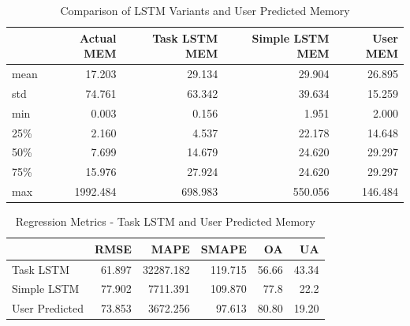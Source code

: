       \begin{table}
        \centering
        \caption{Comparison of LSTM Variants and User Predicted Memory}
        \label{tab:comparison-task-lstm-user-predicted-memory}

        \begin{tabular}{|l|rrrr|}
          \toprule
          {} &  Actual MEM &  Task LSTM MEM &  Simple LSTM MEM &  User MEM \\
          \midrule
          mean &         17.203 &            29.134 &              29.904 &       26.895 \\
          std  &         74.761 &            63.342 &              39.634 &       15.259 \\
          min  &          0.003 &             0.156 &               1.951 &        2.000 \\
          25\%  &          2.160 &             4.537 &              22.178 &       14.648 \\
          50\%  &          7.699 &            14.679 &              24.620 &       29.297 \\
          75\%  &         15.976 &            27.924 &              24.620 &       29.297 \\
          max  &       1992.484 &           698.983 &             550.056 &      146.484 \\
          \bottomrule
          \end{tabular}
      \end{table}
      
      \begin{table}
        \centering
        \caption{Regression Metrics - Task LSTM and User Predicted Memory}
        \label{tab:regression-metrics-task-lstm-user-predicted-memory}
        
        \begin{tabular}{|l|rrrrr|}
          \toprule
          {} &    RMSE &       MAPE &    SMAPE &     OA &     UA \\
          \midrule
          Task LSTM   &  61.897 &  32287.182 &  119.715 &  56.66 &  43.34 \\
          Simple LSTM &  77.902 &  7711.391 &  109.870 &  77.8 &  22.2 \\
          User Predicted &  73.853 &   3672.256 &   97.613 &  80.80 &  19.20 \\
          \bottomrule
          \end{tabular}
      \end{table}


